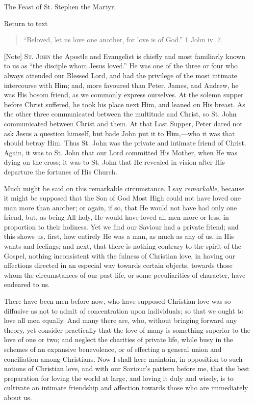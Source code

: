
The Feast of St. Stephen the Martyr.

Return to text


\begin{quote}

``Beloved, let us love one another, for love is of God.''
1 John iv. 7.

\end{quote}

[Note] S\textsc{t}.
J\textsc{ohn} the Apostle and
Evangelist is chiefly and most familiarly known to us as ``the
disciple whom Jesus loved.'' He was one of the three or four who
always attended our Blessed Lord, and had the privilege of the most
intimate intercourse with Him; and, more favoured than Peter, James,
and Andrew, he was His bosom friend, as we commonly express ourselves.
At the solemn supper before Christ suffered, he took his place next
Him, and leaned on His breast. As the other three communicated between
the multitude and Christ, so St. John communicated between Christ and
them. At that Last Supper, Peter dared not ask Jesus a question
himself, but bade John put it to Him,—who it was that should betray
Him. Thus St. John was the private and intimate friend of Christ.
Again, it was to St. John that our Lord committed His Mother, when
He
was dying on the cross; it was to St. John that He revealed in vision
after His departure the fortunes of His Church.

Much might be said on this remarkable circumstance. I say \emph{remarkable},
because it might be supposed that the Son of God Most High could not
have loved one man more than another; or again, if so, that He would
not have had only one friend, but, as being All-holy, He would have
loved all men more or less, in proportion to their holiness. Yet we
find our Saviour had a private friend; and this shows us, first, how
entirely He was a man, as much as any of us, in His wants and
feelings; and next, that there is nothing contrary to the spirit of
the Gospel, nothing inconsistent with the fulness of Christian love,
in having our affections directed in an especial way towards certain
objects, towards those whom the circumstances of our past life, or
some peculiarities of character, have endeared to us.

There have been men before now, who have supposed Christian love
was so diffusive as not to admit of concentration upon individuals; so
that we ought to love all men equally. And many there are, who,
without bringing forward any theory, yet consider practically that the
love of many is something superior to the love of one or two; and
neglect the charities of private life, while busy in the schemes of an
expansive benevolence, or of effecting a general union and
conciliation among Christians. Now I shall here maintain, in
opposition to such notions of Christian love, and with our Saviour's
pattern before me, that the best preparation for loving the world at
large, and loving it duly and wisely, is to cultivate an intimate
friendship and affection towards those who are immediately about us.

